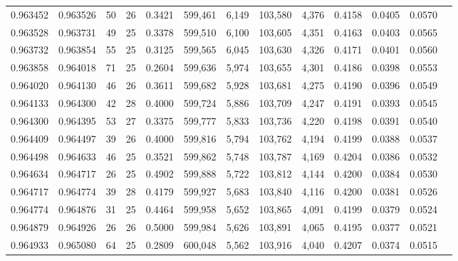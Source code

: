\begin{tabular}{rrrrrrrrrrrrr}
0.963452 & 0.963526 &    50 &  26 &                                     0.3421 & 599,461 &   6,149 & 103,580 &   4,376 & 0.4158 & 0.0405 & 0.0570 \\
0.963528 & 0.963731 &    49 &  25 &                                     0.3378 & 599,510 &   6,100 & 103,605 &   4,351 & 0.4163 & 0.0403 & 0.0565 \\
0.963732 & 0.963854 &    55 &  25 &                                     0.3125 & 599,565 &   6,045 & 103,630 &   4,326 & 0.4171 & 0.0401 & 0.0560 \\
0.963858 & 0.964018 &    71 &  25 &                                     0.2604 & 599,636 &   5,974 & 103,655 &   4,301 & 0.4186 & 0.0398 & 0.0553 \\
0.964020 & 0.964130 &    46 &  26 &                                     0.3611 & 599,682 &   5,928 & 103,681 &   4,275 & 0.4190 & 0.0396 & 0.0549 \\
0.964133 & 0.964300 &    42 &  28 &                                     0.4000 & 599,724 &   5,886 & 103,709 &   4,247 & 0.4191 & 0.0393 & 0.0545 \\
0.964300 & 0.964395 &    53 &  27 &                                     0.3375 & 599,777 &   5,833 & 103,736 &   4,220 & 0.4198 & 0.0391 & 0.0540 \\
0.964409 & 0.964497 &    39 &  26 &                                     0.4000 & 599,816 &   5,794 & 103,762 &   4,194 & 0.4199 & 0.0388 & 0.0537 \\
0.964498 & 0.964633 &    46 &  25 &                                     0.3521 & 599,862 &   5,748 & 103,787 &   4,169 & 0.4204 & 0.0386 & 0.0532 \\
0.964634 & 0.964717 &    26 &  25 &                                     0.4902 & 599,888 &   5,722 & 103,812 &   4,144 & 0.4200 & 0.0384 & 0.0530 \\
0.964717 & 0.964774 &    39 &  28 &                                     0.4179 & 599,927 &   5,683 & 103,840 &   4,116 & 0.4200 & 0.0381 & 0.0526 \\
0.964774 & 0.964876 &    31 &  25 &                                     0.4464 & 599,958 &   5,652 & 103,865 &   4,091 & 0.4199 & 0.0379 & 0.0524 \\
0.964879 & 0.964926 &    26 &  26 &                                     0.5000 & 599,984 &   5,626 & 103,891 &   4,065 & 0.4195 & 0.0377 & 0.0521 \\
0.964933 & 0.965080 &    64 &  25 &                                     0.2809 & 600,048 &   5,562 & 103,916 &   4,040 & 0.4207 & 0.0374 & 0.0515 \\

\end{tabular}
